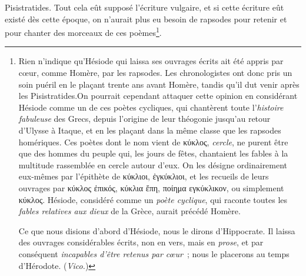 \documentclass[french,twoside]{book} %
\begin{document}
Pisistratides. Tout cela eût supposé l’écriture vulgaire, et si cette écriture eût existé dès cette époque, on n’aurait plus eu besoin de rapsodes pour retenir et pour chanter des morceaux de ces poèmes\footnote{\noindent Rien n’indique qu’Hésiode qui laissa ses ouvrages écrits ait été appris par cœur, comme Homère, par les rapsodes. Les chronologistes ont donc pris un soin puéril en le plaçant trente ans avant Homère, tandis qu’il dut venir après les Pisistratides.On pourrait cependant attaquer cette opinion en considérant Hésiode comme un de ces poètes cycliques, qui chantèrent toute l’{\itshape histoire fabuleuse} des Grecs, depuis l’origine de leur théogonie jusqu’au retour d’Ulysse à Itaque, et en les plaçant dans la même classe que les rapsodes homériques. Ces poètes dont le nom vient de κύκλος, {\itshape cercle}, ne purent être que des hommes du peuple qui, les jours de fêtes, chantaient les fables à la multitude rassemblée en cercle autour d’eux. On les désigne ordinairement eux-mêmes par l’épithète de κύκλιοι, ἐγκύκλιοι, et les recueils de leurs ouvrages par κύκλος ἐπικός, κύκλια ἔπη, ποίημα εγκύκλικον, ou simplement κύκλος. Hésiode, considéré comme un {\itshape poète cyclique}, qui raconte toutes les {\itshape fables relatives aux dieux} de la Grèce, aurait précédé Homère.\par
Ce que nous disions d’abord d’Hésiode, nous le dirons d’Hippocrate. Il laissa des ouvrages considérables écrits, non en vers, mais en {\itshape prose}, et par conséquent {\itshape incapables d’être retenus par cœur} ; nous le placerons au temps d’Hérodote. ({\itshape Vico.})
}.\par
\end{document}
